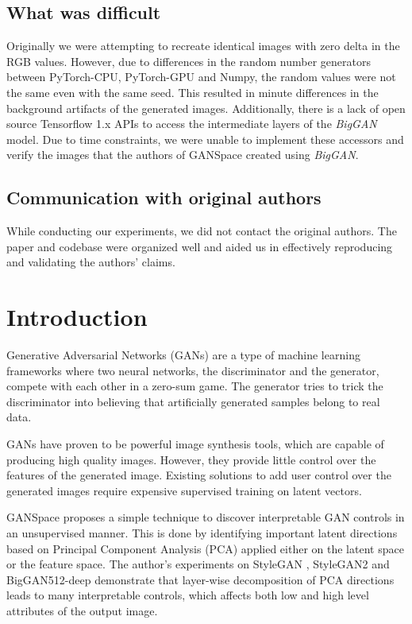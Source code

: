 \subsection*{What was difficult}

Originally we were attempting to recreate identical images with zero delta in the RGB values. However, due to differences in the random number generators between PyTorch-CPU, PyTorch-GPU and Numpy, the random values were not the same even with the same seed. This resulted in minute differences in the background artifacts of the generated images. Additionally, there is a lack of open source Tensorflow 1.x APIs to access the intermediate layers of the \textit{BigGAN} model. Due to time constraints, we were unable to implement these accessors and verify the images that the authors of GANSpace created using \textit{BigGAN}.

\subsection*{Communication with original authors}

While conducting our experiments, we did not contact the original authors. The paper and codebase were organized well and aided us in effectively reproducing and validating the authors' claims.

\newpage

\section{Introduction}

Generative Adversarial Networks (GANs) \cite{gan} are a type of machine learning frameworks where two neural networks, the discriminator and the generator, compete with each other in a zero-sum game. The generator tries to trick the discriminator into believing that artificially generated samples belong to real data.

GANs have proven to be powerful image synthesis tools, which are capable of producing high quality images. However, they provide little control over the features of the generated image. Existing solutions to add user control over the generated images require expensive supervised training on latent vectors.

GANSpace \cite{GANSpace} proposes a simple technique to discover interpretable GAN controls in an unsupervised manner. This is done by identifying important latent directions based on Principal Component Analysis (PCA) applied either on the latent space or the feature space. The author's experiments on StyleGAN \cite{stylegan}, StyleGAN2 \cite{stylegan2} and BigGAN512-deep \cite{biggan} demonstrate that layer-wise decomposition of PCA directions leads to many interpretable controls, which affects both low and high level attributes of the output image.


